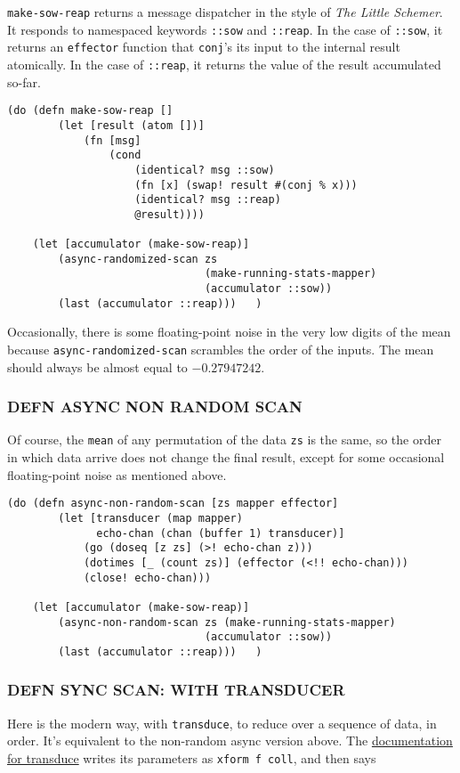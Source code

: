\documentclass[10pt,oneside,x11names]{article}
\begin{document}
\texttt{make-sow-reap} returns a message dispatcher in the style of \emph{The Little
Schemer}. It responds to namespaced keywords \texttt{::sow} and \texttt{::reap}. In
the case of \texttt{::sow}, it returns an \texttt{effector} function that \texttt{conj}'s its
input to the internal result atomically. In the case of \texttt{::reap}, it
returns the value of the result accumulated so-far.

\begin{verbatim}
(do (defn make-sow-reap []
        (let [result (atom [])]
            (fn [msg]
                (cond
                    (identical? msg ::sow)
                    (fn [x] (swap! result #(conj % x)))
                    (identical? msg ::reap)
                    @result))))

    (let [accumulator (make-sow-reap)]
        (async-randomized-scan zs
                               (make-running-stats-mapper)
                               (accumulator ::sow))
        (last (accumulator ::reap)))   )
\end{verbatim}

Occasionally, there is some floating-point noise in the very low digits
of the mean because \texttt{async-randomized-scan} scrambles the order of the
inputs. The mean should always be almost equal to \(-0.27947242\).

\subsubsection{DEFN ASYNC NON RANDOM SCAN}
\label{not-randomized}
Of course, the \texttt{mean} of any permutation of the data \texttt{zs} is the same,
so the order in which data arrive does not change the final result,
except for some occasional floating-point noise as mentioned above.

\begin{verbatim}
(do (defn async-non-random-scan [zs mapper effector]
        (let [transducer (map mapper)
              echo-chan (chan (buffer 1) transducer)]
            (go (doseq [z zs] (>! echo-chan z)))
            (dotimes [_ (count zs)] (effector (<!! echo-chan)))
            (close! echo-chan)))

    (let [accumulator (make-sow-reap)]
        (async-non-random-scan zs (make-running-stats-mapper)
                               (accumulator ::sow))
        (last (accumulator ::reap)))   )
\end{verbatim}

\subsubsection{DEFN SYNC SCAN: WITH TRANSDUCER}
\label{sync-scan-with-transducer}
Here is the modern way, with \texttt{transduce}, to reduce over a sequence of
data, in order. It's equivalent to the non-random async version above.
The \href{https://clojuredocs.org/clojure.core/transduce}{documentation for
transduce} writes its parameters as \texttt{xform f coll}, and then says
\end{document}
